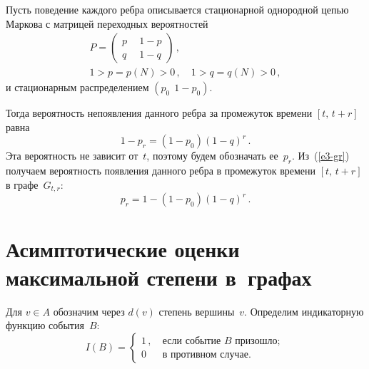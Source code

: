 \begin{multicols}{2}
     Пусть поведение каждого ребра описывается стационарной однородной цепью 
Маркова с мат\-ри\-цей переходных вероятностей
     \begin{multline*}
     P=\begin{pmatrix}
     p &\ \  1-p\\
     q &\ \  1-q
     \end{pmatrix}\,,\\ 1>p=p(N)>0\,,\quad 1>q=q(N)>0\,,
     \end{multline*}
и стационарным распределением 
$\left( p_0\ \  1-p_0\right)$.

     
     Тогда вероятность непоявления данного ребра за промежуток времени $[t,\,t+r]$ 
равна
     \begin{equation}
     1-p_r=(1-p_0)(1-q)^r\,.
     \label{e3-gr}
     \end{equation}
 Эта вероятность не зависит от~$t$, поэтому будем обозначать ее~$p_r$. Из~(\ref{e3-gr}) 
     получаем вероятность появления данного ребра в промежуток времени $[t,\,t+r]$ в 
графе~$G_{t,r}$:
     \begin{equation*}
     p_r=1-(1-p_0)(1-q)^r\,.
     \end{equation*}
     
\section{Асимптотические оценки максимальной степени в~графах~{}}

     Для $v\in A$ обозначим через $d(v)$ степень вершины~$v$. Определим 
индикаторную функцию события~$B$:
     $$
     I(B)=\begin{cases}
     1\,, &\ \mbox{если событие $B$ призошло};\\
     0 &\ \mbox{в противном случае.}
     \end{cases}
     $$
     

\end{multicols}
